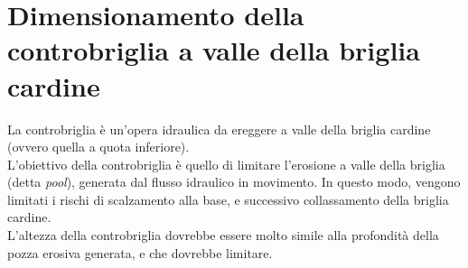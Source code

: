 \section{Dimensionamento della controbriglia a valle della briglia cardine}
La controbriglia è un'opera idraulica da ereggere a valle della briglia cardine (ovvero quella a quota inferiore).\\
L'obiettivo della controbriglia è quello di limitare l'erosione a valle della briglia (detta \textit{pool}), generata dal flusso idraulico in movimento. In questo modo, vengono limitati i rischi di scalzamento alla base, e successivo collassamento della briglia cardine.\\
L'altezza della controbriglia dovrebbe essere molto simile alla profondità della pozza erosiva generata, e che dovrebbe limitare.

